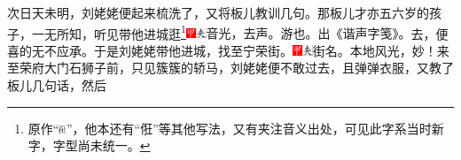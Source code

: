 次日天未明，刘姥姥便起来梳洗了，又将板儿教训几句。那板儿才亦五六岁的孩子，一无所知，听见带他进城逛\footnote{原作“\includegraphics[width=6.4pt,height=6.4pt,align=c,vshift=1pt]{../images/00017}”，他本还有“俇”等其他写法，又有夹注音义出处，可见此字系当时新字，字型尚未统一。}{\includegraphics[width=3mm]{../Images/00002}\includegraphics[width=3mm]{../Images/00012}\footnotesize \kaishu 音光，去声。游也。出《谐声字笺》。}去，便喜的无不应承。于是刘姥姥带他进城，找至宁荣街。{\includegraphics[width=3mm]{../Images/00002}\includegraphics[width=3mm]{../Images/00012}\footnotesize \kaishu 街名。本地风光，妙！}来至荣府大门石狮子前，只见簇簇的轿马，刘姥姥便不敢过去，且弹弹衣服，又教了板儿几句话，然后